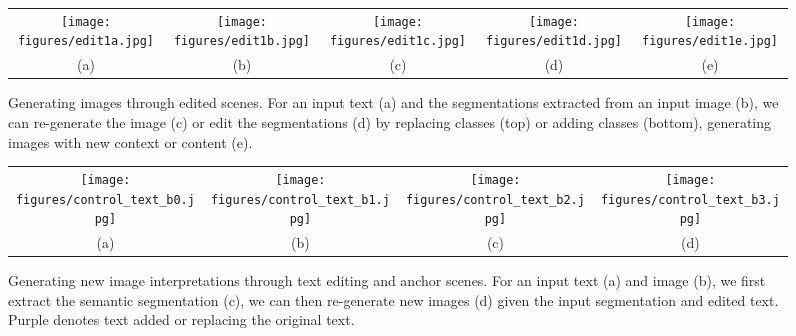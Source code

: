 \documentclass[final]{cvpr}
\begin{document}
\begin{figure*}[t!]
    \centering
    \setlength{\tabcolsep}{4.0pt}
    \begin{tabular}{ccc@{~~~}c@{}c@{~~~}}
        \texttt{[image: figures/edit1a.jpg]} &
        \texttt{[image: figures/edit1b.jpg]} & 
        \texttt{[image: figures/edit1c.jpg]} & 
        \texttt{[image: figures/edit1d.jpg]} & 
        \texttt{[image: figures/edit1e.jpg]} \\
        (a) & (b) & (c) & (d) & (e) 
    \end{tabular}
    \caption{Generating images through edited scenes. For an input text (a) and the segmentations extracted from an input image (b), we can re-generate the image (c) or edit the segmentations (d) by replacing classes (top) or adding classes (bottom), generating images with new context or content (e).}
    \label{fig:edit_scene}
    \vskip -0.1in
\end{figure*}

\begin{figure*}[t!]
    \centering
    \setlength{\tabcolsep}{3.0pt}
    \begin{tabular}{cc@{~~}cc}
        \texttt{[image: figures/control\_text\_b0.jpg]} &
        \texttt{[image: figures/control\_text\_b1.jpg]} &
        \texttt{[image: figures/control\_text\_b2.jpg]} &
        \texttt{[image: figures/control\_text\_b3.jpg]} \\
        (a) & (b) & (c) & (d) \\
    \end{tabular}
    \caption{Generating new image interpretations through text editing and anchor scenes. For an input text (a) and image (b), we first extract the semantic segmentation (c), we can then re-generate new images (d) given the input segmentation and edited text. Purple denotes text added or replacing the original text.}
    \label{fig:edit_text}
    \vskip -0.1in
\end{figure*}
\end{document}

